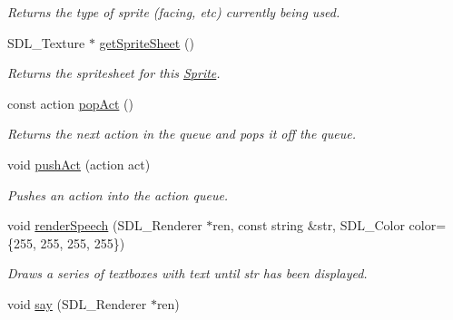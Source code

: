 \begin{DoxyCompactItemize}
\begin{DoxyCompactList}\small\item\em Returns the type of sprite (facing, etc) currently being used. \end{DoxyCompactList}\item 
S\+D\+L\+\_\+\+Texture $\ast$ \hyperlink{class_sprite_abec247d2cd9396834344c3cfe81eddc1}{get\+Sprite\+Sheet} ()\hypertarget{class_sprite_abec247d2cd9396834344c3cfe81eddc1}{}\label{class_sprite_abec247d2cd9396834344c3cfe81eddc1}

\begin{DoxyCompactList}\small\item\em Returns the spritesheet for this \hyperlink{class_sprite}{Sprite}. \end{DoxyCompactList}\item 
const action \hyperlink{class_sprite_a1b5ac18ba8c0a4e4245d1ed49b9a48aa}{pop\+Act} ()\hypertarget{class_sprite_a1b5ac18ba8c0a4e4245d1ed49b9a48aa}{}\label{class_sprite_a1b5ac18ba8c0a4e4245d1ed49b9a48aa}

\begin{DoxyCompactList}\small\item\em Returns the next action in the queue and pops it off the queue. \end{DoxyCompactList}\item 
void \hyperlink{class_sprite_a25d3b1c4533e8aa9e530d7025dc5365b}{push\+Act} (action act)\hypertarget{class_sprite_a25d3b1c4533e8aa9e530d7025dc5365b}{}\label{class_sprite_a25d3b1c4533e8aa9e530d7025dc5365b}

\begin{DoxyCompactList}\small\item\em Pushes an action into the action queue. \end{DoxyCompactList}\item 
void \hyperlink{class_sprite_a602e995adde51d155e2d0e83285f0643}{render\+Speech} (S\+D\+L\+\_\+\+Renderer $\ast$ren, const string \&str, S\+D\+L\+\_\+\+Color color=\{255, 255, 255, 255\})\hypertarget{class_sprite_a602e995adde51d155e2d0e83285f0643}{}\label{class_sprite_a602e995adde51d155e2d0e83285f0643}

\begin{DoxyCompactList}\small\item\em Draws a series of textboxes with text until str has been displayed. \end{DoxyCompactList}\item 
void \hyperlink{class_sprite_a14a138e5acf82b97c052673dffb744f6}{say} (S\+D\+L\+\_\+\+Renderer $\ast$ren)\hypertarget{class_sprite_a14a138e5acf82b97c052673dffb744f6}{}\label{class_sprite_a14a138e5acf82b97c052673dffb744f6}


\end{DoxyCompactItemize}
